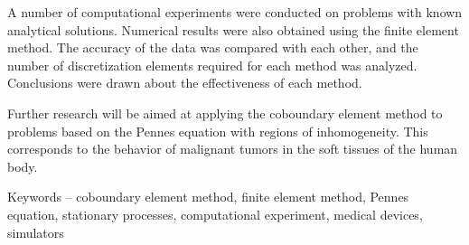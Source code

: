 \documentclass[a4paper,14pt]{extreport}
\begin{document}
A number of computational experiments were conducted on problems with known analytical solutions. Numerical results were
also obtained using the finite element method. The accuracy of the data was compared with each other, and the number of
discretization elements required for each method was analyzed. Conclusions were drawn about the effectiveness of each
method.

Further research will be aimed at applying the coboundary element method to problems based on the Pennes equation with
regions of inhomogeneity. This corresponds to the behavior of malignant tumors in the soft tissues of the human body.

Keywords -- coboundary element method, finite element method, Pennes equation, stationary processes, computational
experiment, medical devices, simulators



\mainmatter%

% 




\clearpage
{}


\end{document}
